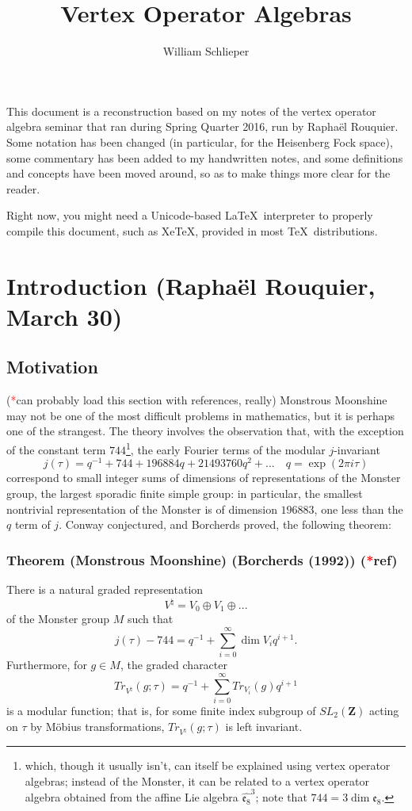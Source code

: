 \documentclass{article}
\author{William Schlieper}
\title{Vertex Operator Algebras}
\newcommand{\ZZ}{\mathbold{Z}}
\newcommand{\tk}{\textcolor{red}{*}}
\begin{document}
\maketitle
This document is a reconstruction based on my notes of the vertex operator algebra seminar that ran during Spring Quarter 2016, run by Raphaël Rouquier.  Some notation has been changed (in particular, for the Heisenberg Fock space), some commentary has been added to my handwritten notes, and some definitions and concepts have been moved around, so as to make things more clear for the reader.

Right now, you might need a Unicode-based \LaTeX\ interpreter to properly compile this document, such as XeTeX, provided in most \TeX\ distributions.
\tableofcontents

\section{Introduction (Raphaël Rouquier, March 30)}
\label{sec:intro}

\subsection{Motivation}
\label{sec:mot}
(\tk can probably load this section with references, really)
Monstrous Moonshine may not be one of the most difficult problems in mathematics, but it is perhaps one of the strangest.  The theory involves the observation that, with the exception of the constant term $744$\footnote{which, though it usually isn't, can itself be explained using vertex operator algebras; instead of the Monster, it can be related to a vertex operator algebra obtained from the affine Lie algebra $\widehat{\mathfrak{e}_8}^3$; note that $744=3 \dim \mathfrak{e}_8$.}, the early Fourier terms of the modular $j$-invariant
\[j(\tau)=q^{-1}+744+196884q+21493760q^2+... \quad q=\exp(2 \pi i \tau)\]
correspond to small integer sums of dimensions of representations of the Monster group, the largest sporadic finite simple group: in particular, the smallest nontrivial representation of the Monster is of dimension $196883$, one less than the $q$ term of $j$.  Conway conjectured, and Borcherds proved, the following theorem:
\subsubsection{Theorem (Monstrous Moonshine) (Borcherds (1992)) (\tk ref)}
\label{sec:monmoon}
There is a natural graded representation
\[V^\natural = V_0 \oplus V_1 \oplus ... \]
of the Monster group $M$ such that
\[j(\tau)-744=q^{-1}+\sum_{i=0}^{\infty} \dim V_i q^{i+1}. \]
Furthermore, for $g \in M$, the graded character
\[Tr_{V^\natural}(g;\tau)=q^{-1}+\sum_{i=0}^{\infty} Tr_{V_i}(g) q^{i+1} \]
is a modular function; that is, for some finite index subgroup of $SL_2(\ZZ)$ acting on $\tau$ by Möbius transformations, $Tr_{V^\natural}(g;\tau)$ is left invariant.
\end{document}
